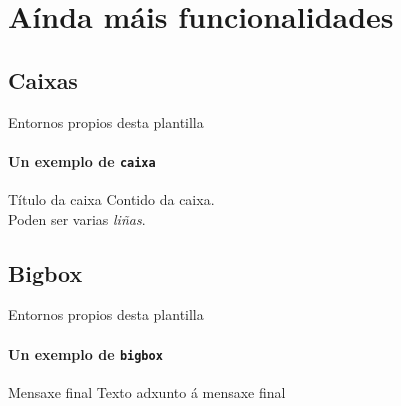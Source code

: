 \documentclass[11pt,aspectratio=169]{beamer}
\begin{document}
\section{Aínda máis funcionalidades}

\subsection*{Caixas}

\begin{frame}{Entornos propios desta plantilla}
\framesubtitle{Un exemplo de \texttt{caixa}}
 \begin{caixa}{Título da caixa}
  Contido da caixa.\\
  Poden ser varias \textit{liñas}.
 \end{caixa}
\end{frame}

\subsection*{Bigbox}

\begin{frame}{Entornos propios desta plantilla}
\framesubtitle{Un exemplo de \texttt{bigbox}}
\end{frame}



\begin{finishslides}{Mensaxe final}
  Texto adxunto á mensaxe final
\end{finishslides}
\end{document}
